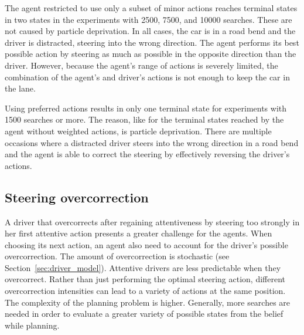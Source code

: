 The agent restricted to use only a subset of minor actions reaches terminal states in two states in the experiments with 2500, 7500, and 10000 searches. These are not caused by particle deprivation. In all cases, the car is in a road bend and the driver is distracted, steering into the wrong direction. The agent performs its best possible action by steering as much as possible in the opposite direction than the driver. However, because the agent's range of actions is severely limited, the combination of the agent's and driver's actions is not enough to keep the car in the lane. 

Using preferred actions results in only one terminal state for experiments with 1500 searches or more. The reason, like for the terminal states reached by the agent without weighted actions, is particle deprivation. There are multiple occasions where a distracted driver steers into the wrong direction in a road bend and the agent is able to correct the steering by effectively reversing the driver's actions.





\subsection{Steering overcorrection}

A driver that overcorrects after regaining attentiveness by steering too strongly in her first attentive action presents a greater challenge for the agents. When choosing its next action, an agent also need to account for the driver's possible overcorrection. The amount of overcorrection is stochastic (see Section~\ref{sec:driver_model}). Attentive drivers are less predictable when they overcorrect. Rather than just performing the optimal steering action, different overcorrection intensities can lead to a variety of actions at the same position. The complexity of the planning problem is higher. Generally, more searches are needed in order to evaluate a greater variety of possible states from the belief while planning.



